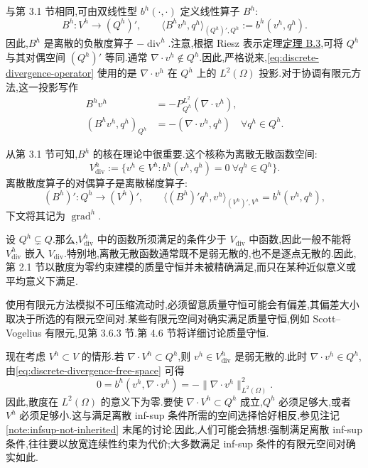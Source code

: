 \begin{note}[离散无散函数空间]\label{note:discretely-divergence-free-space}
与第 3.1 节相同,可由双线性型 $b^h(\cdot,\cdot)$ 定义线性算子 $B^h$:
\begin{equation}\label{eq:discrete-divergence-operator}
  B^h:V^h\longrightarrow(Q^h)',
  \qquad \langle B^h v^h,q^h\rangle_{(Q^h)',Q^h}
        :=b^h(v^h,q^h).
\end{equation}
因此,$B^h$ 是离散的负散度算子 $-\operatorname{div}^h$.注意,根据 Riesz 表示定理\hyperref[thm:appendix-b-3]{定理 B.3},可将 $Q^h$ 与其对偶空间 $(Q^h)'$ 等同.通常 $\nabla\cdot v^h\notin Q^h$.因此,严格说来,\cref{eq:discrete-divergence-operator} 使用的是 $\nabla\cdot v^h$ 在 $Q^h$ 上的 $L^2(\Omega)$ 投影.对于协调有限元方法,这一投影写作
\[
  \begin{aligned}
    B^h v^h&=-P_{Q^h}^{L^2}(\nabla\cdot v^h),\\
    (B^h v^h,q^h)_{Q^h}
      &=-(\nabla\cdot v^h,q^h)\quad\forall q^h\in Q^h.
  \end{aligned}
\]

从第 3.1 节可知,$B^h$ 的核在理论中很重要.这个核称为离散无散函数空间:
\begin{equation}\label{eq:discrete-divergence-free-space}
  V_{\mathrm{div}}^h
   :=\{v^h\in V^h:b^h(v^h,q^h)=0\ \forall q^h\in Q^h\}.
\end{equation}
离散散度算子的对偶算子是离散梯度算子:
\begin{equation}\label{eq:discrete-gradient-operator}
  (B^h)':Q^h\longrightarrow(V^h)',
  \qquad \langle(B^h)'q^h,v^h\rangle_{(V^h)',V^h}
       =b^h(v^h,q^h),
\end{equation}
下文将其记为 $\operatorname{grad}^h$.
\end{note}

\begin{note}[离散无散函数与质量守恒的偏离]\label{note:mass-conservation-discrete-spaces}
设 $Q^h\subsetneq Q$.那么,$V_{\mathrm{div}}^h$ 中的函数所须满足的条件少于 $V_{\mathrm{div}}$ 中函数,因此一般不能将 $V_{\mathrm{div}}^h$ 嵌入 $V_{\mathrm{div}}$.特别地,离散无散函数通常既不是弱无散的,也不是逐点无散的.因此,第 2.1 节以散度为零约束建模的质量守恒并未被精确满足,而只在某种近似意义或平均意义下满足.

使用有限元方法模拟不可压缩流动时,必须留意质量守恒可能会有偏差,其偏差大小取决于所选的有限元空间对.某些有限元空间对确实满足质量守恒,例如 Scott--Vogelius 有限元,见第 3.6.3 节.第 4.6 节将详细讨论质量守恒.

现在考虑 $V^h\subset V$ 的情形.若 $\nabla\cdot V^h\subset Q^h$,则 $v^h\in V_{\mathrm{div}}^h$ 是弱无散的.此时 $\nabla\cdot v^h\in Q^h$,由\cref{eq:discrete-divergence-free-space} 可得
\[
  0=b^h(v^h,\nabla\cdot v^h)
    =-\|\nabla\cdot v^h\|_{L^2(\Omega)}^2.
\]
因此,散度在 $L^2(\Omega)$ 的意义下为零.要使 $\nabla\cdot V^h\subset Q^h$ 成立,$Q^h$ 必须足够大,或者 $V^h$ 必须足够小.这与满足离散 inf-sup 条件所需的空间选择恰好相反,参见注记\ref{note:infsup-not-inherited} 末尾的讨论.因此,人们可能会猜想:强制满足离散 inf-sup 条件,往往要以放宽连续性约束为代价;大多数满足 inf-sup 条件的有限元空间对确实如此.
\end{note}

